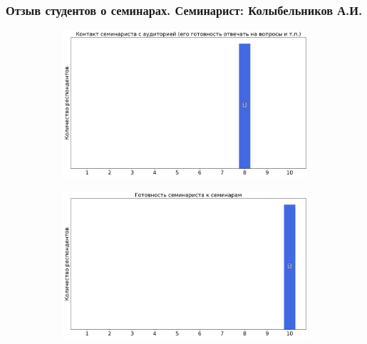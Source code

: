     \subsubsection{Отзыв студентов о семинарах. Семинарист: Колыбельников А.И.}
        \begin{figure}[H]
            \centering
            \begin{subfigure}[b]{0.45\textwidth}
                \centering
                \includegraphics[width=\textwidth]{images/4 course/Защита информации/seminarists-marks-Колыбельников А.И.-0.png}
            \end{subfigure}
            \begin{subfigure}[b]{0.45\textwidth}
                \centering
                \includegraphics[width=\textwidth]{images/4 course/Защита информации/seminarists-marks-Колыбельников А.И.-1.png}
            \end{subfigure}
            \begin{subfigure}[b]{0.45\textwidth}
                \centering

\end{subfigure}
\end{figure}
